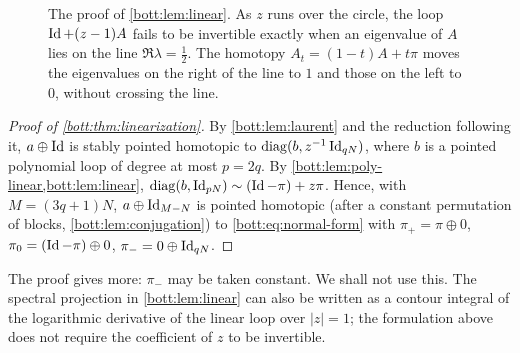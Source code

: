 \begin{figure}[ht]
\centering
{}
\caption{The proof of \cref{bott:lem:linear}. As $z$ runs over the circle, the
loop $\operatorname{Id}+(z-1)A$ fails to be invertible exactly when an eigenvalue of $A$ lies
on the line $\Re\lambda=\frac12$. The homotopy $A_t=(1-t)A+t\pi$ moves the
eigenvalues on the right of the line to $1$ and those on the left to $0$,
without crossing the line.}
\label{bott:fig:linear}
\end{figure}

\begin{proof}[Proof of \cref{bott:thm:linearization}]
  By \cref{bott:lem:laurent} and the reduction following it, $a\oplus\operatorname{Id}$ is stably
  pointed homotopic to $\operatorname{diag}(b,z^{-1}\operatorname{Id}_{qN})$, where $b$ is a pointed polynomial loop
  of degree at most $p=2q$. By \cref{bott:lem:poly-linear,bott:lem:linear},
  $\operatorname{diag}(b,\operatorname{Id}_{pN})\sim(\operatorname{Id}-\pi)+z\pi$. Hence, with $M=(3q+1)N$,
  $a\oplus\operatorname{Id}_{M-N}$ is pointed homotopic (after a constant permutation of blocks,
  \cref{bott:lem:conjugation}) to \eqref{bott:eq:normal-form} with
  $\pi_+=\pi\oplus0$, $\pi_0=(\operatorname{Id}-\pi)\oplus0$, $\pi_-=0\oplus\operatorname{Id}_{qN}$.
\end{proof}

\begin{remark}\label{bott:rem:linearization}
  The proof gives more: $\pi_-$ may be taken constant. We shall not use this. The
  spectral projection in \cref{bott:lem:linear} can also be written as a contour integral
  of the logarithmic derivative of the linear loop over $|z|=1$; the formulation above
  does not require the coefficient of $z$ to be invertible.
\end{remark}

